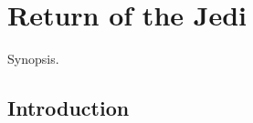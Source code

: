 \chapter{Return of the Jedi}

\graphicspath{{figures/chapter-7/}}


\begin{synopsis}
	Synopsis.
\end{synopsis}


\section{Introduction}

\lipsum[10]

